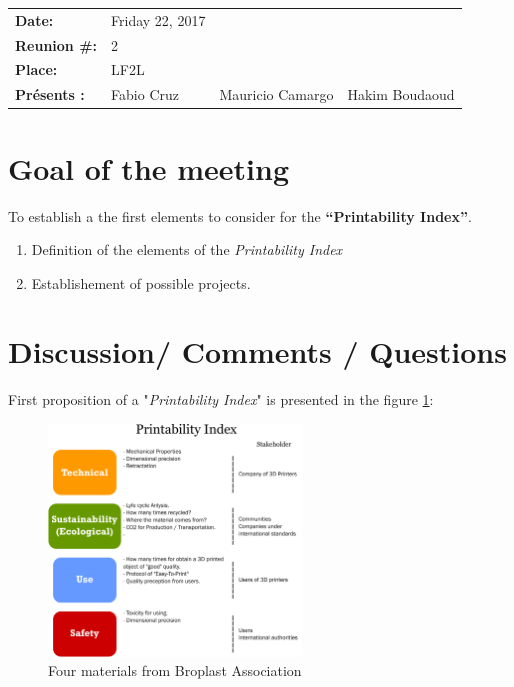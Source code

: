 \begin{flushleft}
	\begin{tabular}{l l l l}

{\Large \textbf{Date:}}	& Friday 22, 2017 & &\\
{\Large \textbf{Reunion \#: }} & 2 & & \\ 
{\Large \textbf{Place: }} & LF2L & &\\ %
{\Large \textbf{Présents : }}	& \tabitem Fabio Cruz & \tabitem Mauricio Camargo & \tabitem Hakim Boudaoud\\		
	\end{tabular}
\end{flushleft}


\section*{Goal of the meeting} 
To establish a the first elements to consider for the \textbf{``Printability Index''}.
\begin{enumerate}[noitemsep]
	\item Definition of the elements of the \textit{Printability Index}
	\item Establishement of possible projects.
\end{enumerate}


\section*{Discussion/ Comments / Questions} 

First proposition of a "\textit{Printability Index}" is presented in the figure \ref{Printability.Index}:

\begin{figure}[H]
	\centering
	\includegraphics[width=0.6\textwidth]{Figures/Printability-Index/Methodology.pdf}
	\caption{Four materials from Broplast Association}
	\label{Printability.Index}
\end{figure}

